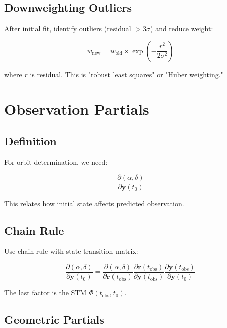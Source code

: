 \subsection{Downweighting Outliers}

After initial fit, identify outliers (residual $> 3\sigma$) and reduce weight:

\begin{equation}
    w_{\text{new}} = w_{\text{old}} \times \exp\left(-\frac{r^2}{2\sigma^2}\right)
\end{equation}

where $r$ is residual. This is "robust least squares" or "Huber weighting."

\section{Observation Partials}

\subsection{Definition}

For orbit determination, we need:

\begin{equation}
    \frac{\partial(\alpha, \delta)}{\partial\mathbf{y}(t_0)}
\end{equation}

This relates how initial state affects predicted observation.

\subsection{Chain Rule}

Use chain rule with state transition matrix:

\begin{equation}
    \frac{\partial(\alpha, \delta)}{\partial\mathbf{y}(t_0)} = \frac{\partial(\alpha, \delta)}{\partial\mathbf{r}(t_{\text{obs}})} \frac{\partial\mathbf{r}(t_{\text{obs}})}{\partial\mathbf{y}(t_{\text{obs}})} \frac{\partial\mathbf{y}(t_{\text{obs}})}{\partial\mathbf{y}(t_0)}
\end{equation}

The last factor is the STM $\Phi(t_{\text{obs}}, t_0)$.

\subsection{Geometric Partials}


